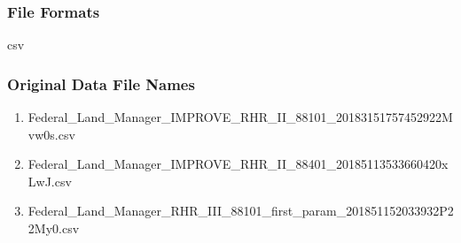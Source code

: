 \subsubsection*{File Formats} 
csv










\subsubsection*{Original Data File Names}

\begin{enumerate}[noitemsep]
\item Federal\_Land\_Manager\_IMPROVE\_RHR\_II\_88101\_20183151757452922Mvw0s.csv %
\item Federal\_Land\_Manager\_IMPROVE\_RHR\_II\_88401\_20185113533660420xLwJ.csv  %
\item  Federal\_Land\_Manager\_RHR\_III\_88101\_first\_param\_201851152033932P22My0.csv  %


\end{enumerate}

